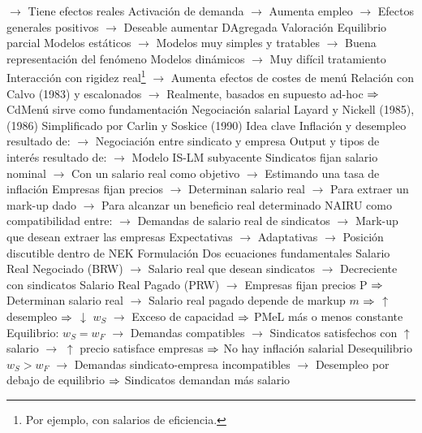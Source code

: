 \documentclass{nuevotema}
\begin{document}
\begin{esquemal}
				\4[] $\to$ Tiene efectos reales
				\4[] Activación de demanda
				\4[] $\to$ Aumenta empleo
				\4[] $\to$ Efectos generales positivos
				\4[] $\to$ Deseable aumentar DAgregada
				\4 Valoración
				\4[] Equilibrio parcial
				\4[] Modelos estáticos
				\4[] $\to$ Modelos muy simples y tratables
				\4[] $\to$ Buena representación del fenómeno
				\4[] Modelos dinámicos
				\4[] $\to$ Muy difícil tratamiento
				\4[] Interacción con rigidez real\footnote{Por ejemplo, con salarios de eficiencia.}
				\4[] $\to$ Aumenta efectos de costes de menú
				\4[] Relación con Calvo (1983) y escalonados
				\4[] $\to$ Realmente, basados en supuesto ad-hoc
				\4[] $\Rightarrow$ CdMenú sirve como fundamentación
			\3 Negociación salarial
				\4 Layard y Nickell (1985), (1986)
				\4[] Simplificado por Carlin y Soskice (1990)
				\4 Idea clave
				\4[] Inflación y desempleo resultado de:
				\4[] $\to$ Negociación entre sindicato y empresa
				\4[] Output y tipos de interés resultado de:
				\4[] $\to$  Modelo IS-LM subyacente
				\4[] Sindicatos fijan salario nominal
				\4[] $\to$ Con un salario real como objetivo
				\4[] $\to$ Estimando una tasa de inflación
				\4[] Empresas fijan precios
				\4[] $\to$ Determinan salario real
				\4[] $\to$ Para extraer un mark-up dado
				\4[] $\to$ Para alcanzar un beneficio real determinado
				\4[] NAIRU como compatibilidad entre:
				\4[] $\to$ Demandas de salario real de sindicatos
				\4[] $\to$ Mark-up que desean extraer las empresas
				\4[] Expectativas
				\4[] $\to$ Adaptativas
				\4[] $\to$ Posición discutible dentro de NEK
				\4 Formulación
				\4[] Dos ecuaciones fundamentales
				\4[] Salario Real Negociado (BRW)
				\4[] 
				\4[] $\to$ Salario real que desean sindicatos
				\4[] $\to$ Decreciente con sindicatos
				\4[] Salario Real Pagado (PRW)
				\4[] 
				\4[] $\to$ Empresas fijan precios P
				\4[] $\Rightarrow$ Determinan salario real
				\4[] $\to$ Salario real pagado depende de markup $m$
				\4[] $\Rightarrow$ $\uparrow$ desempleo $\Rightarrow$ $\downarrow$ $w_S$
				\4[] $\to$ Exceso de capacidad
				\4[] $\Rightarrow$ PMeL más o menos constante
				\4[] Equilibrio: $w_S = w_F$
				\4[] $\to$ Demandas compatibles
				\4[] $\to$ Sindicatos satisfechos con $\uparrow$ salario
				\4[] $\to$ $\uparrow$ precio satisface empresas
				\4[] $\Rightarrow$ No hay inflación salarial
				\4[] Desequilibrio $w_S > w_F$
				\4[] $\to$ Demandas sindicato-empresa incompatibles
				\4[] $\to$ Desempleo por debajo de equilibrio
				\4[] $\Rightarrow$ Sindicatos demandan más salario

\end{esquemal}
\end{document}

